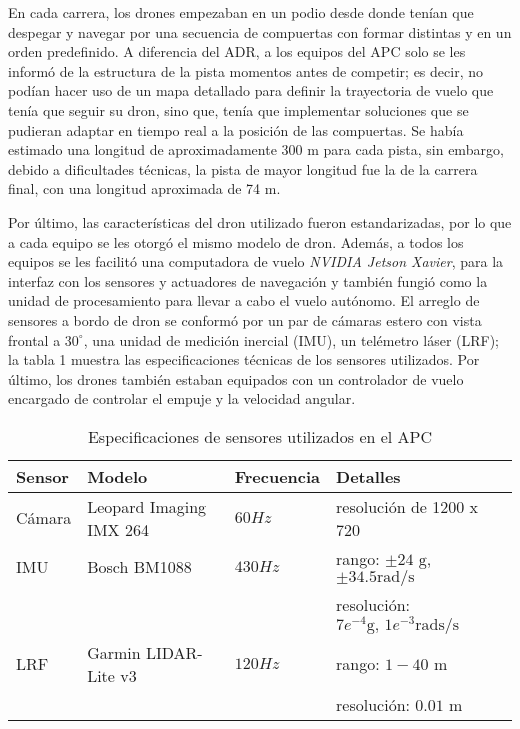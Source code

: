 En cada carrera, los drones empezaban en un podio desde donde tenían que despegar y navegar por una secuencia de compuertas con formar distintas y en un orden predefinido. A diferencia del ADR, a los equipos del APC solo se les informó de la estructura de la pista momentos antes de competir; es decir, no podían hacer uso de un mapa detallado para definir la trayectoria de vuelo que tenía que seguir su dron, sino que, tenía que implementar soluciones que se pudieran adaptar en tiempo real a la posición de las compuertas. Se había estimado una longitud de aproximadamente 300 m para cada pista, sin embargo, debido a dificultades técnicas, la pista de mayor longitud fue la de la carrera final, con una longitud aproximada de 74 m\cite{foehn2020alphapilot}.   

Por último, las características del dron utilizado fueron estandarizadas, por lo que a cada equipo se les otorgó el mismo modelo de dron. Además, a todos los equipos se les facilitó una computadora de vuelo \textit{NVIDIA Jetson Xavier}, para la interfaz con los sensores y actuadores de navegación y también fungió como la unidad de procesamiento para llevar a cabo el vuelo autónomo. El arreglo de sensores a bordo de dron se conformó por un par de cámaras estero con  vista frontal a $30^\circ$, una unidad de medición inercial (IMU), un telémetro láser (LRF); la tabla 1 muestra las especificaciones técnicas de los sensores utilizados. Por último, los drones también estaban equipados con un controlador de vuelo encargado de controlar el empuje y la velocidad angular.

\begin{table}
    \centering
    \begin{tabular}{llll}
        \hline
        Sensor & Modelo & Frecuencia & Detalles\\
        \hline
        \hline
        Cámara & Leopard Imaging IMX 264 & $60 Hz$ & resolución de 1200 x 720\\
        IMU & Bosch BM1088 & $430 Hz$ & rango: $\pm 24 \text{ g}$, $\pm 34.5 \text{rad/s}$\\
         & & & resolución: $7e^{-4}\text{g, } 1e^{-3}\text{rads/s}$\\
        LRF & Garmin LIDAR-Lite v3 & $120 Hz$ & rango: $1-40$ m\\
        & & & resolución: $0.01 \text{ m}$\\
        \hline
        \hline
    \end{tabular}
    \caption{Especificaciones de sensores utilizados en el APC \cite{foehn2020alphapilot}}
    \label{tab:sensors}
\end{table}

